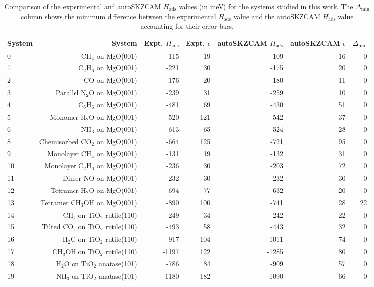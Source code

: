 \begin{table}
\caption{\label{tab:hads_comparison}Comparison of the experimental and autoSKZCAM $H_\textrm{ads}$ values (in meV) for the systems studied in this work. The $\Delta_\textrm{min}$ column shows the minimum difference between the experimental $H_\textrm{ads}$ value and the autoSKZCAM $H_\textrm{ads}$ value accounting for their error bars.}
\begin{adjustbox}{center,max width=0.9\textwidth}
\begin{tabular}{lrrrrrr}
\toprule
System & System & Expt. $H_\textrm{ads}$ & Expt. $\epsilon$ & autoSKZCAM $H_\textrm{ads}$ & autoSKZCAM $\epsilon$ & $\Delta_\textrm{min}$ \\ 
\midrule
0 & CH$_4$ on MgO(001) & -115 & 19 & -109 & 16 & 0 \\
1 & C$_2$H$_6$ on MgO(001) & -221 & 30 & -175 & 20 & 0 \\
2 & CO on MgO(001) & -176 & 20 & -180 & 11 & 0 \\
3 & Parallel N$_2$O on MgO(001) & -239 & 31 & -259 & 10 & 0 \\
4 & C$_6$H$_6$ on MgO(001) & -481 & 69 & -430 & 51 & 0 \\
5 & Monomer H$_2$O on MgO(001) & -520 & 121 & -542 & 37 & 0 \\
6 & NH$_3$ on MgO(001) & -613 & 65 & -524 & 28 & 0 \\
8 & Chemisorbed CO$_2$ on MgO(001) & -664 & 125 & -721 & 95 & 0 \\
9 & Monolayer CH$_4$ on MgO(001) & -131 & 19 & -132 & 31 & 0 \\
10 & Monolayer C$_2$H$_6$ on MgO(001) & -236 & 30 & -203 & 72 & 0 \\
11 & Dimer NO on MgO(001) & -232 & 30 & -232 & 30 & 0 \\
12 & Tetramer H$_2$O on MgO(001) & -694 & 77 & -632 & 20 & 0 \\
13 & Tetramer CH$_3$OH on MgO(001) & -890 & 100 & -741 & 28 & 22 \\
14 & CH$_4$ on TiO$_2$ rutile(110) & -249 & 34 & -242 & 22 & 0 \\
15 & Tilted CO$_2$ on TiO$_2$ rutile(110) & -493 & 58 & -443 & 32 & 0 \\
16 & H$_2$O on TiO$_2$ rutile(110) & -917 & 104 & -1011 & 74 & 0 \\
17 & CH$_3$OH on TiO$_2$ rutile(110) & -1197 & 122 & -1285 & 80 & 0 \\
18 & H$_2$O on TiO$_2$ anatase(101) & -786 & 84 & -909 & 57 & 0 \\
19 & NH$_3$ on TiO$_2$ anatase(101) & -1180 & 182 & -1090 & 66 & 0 \\
\bottomrule
\end{tabular}
\end{adjustbox}
\end{table}